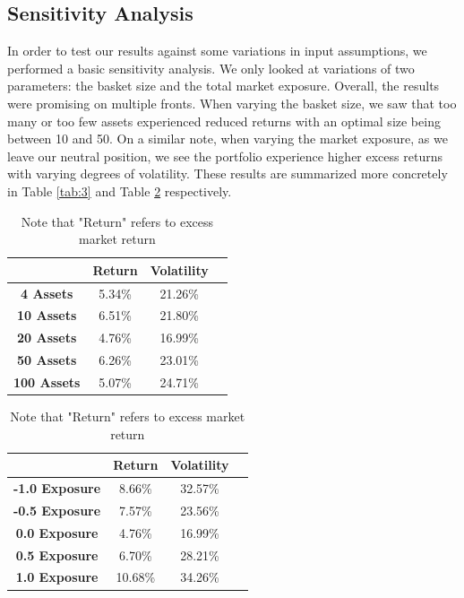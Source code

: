 \documentclass[final]{article}
\begin{document}
\subsection{Sensitivity Analysis}
\hspace{\parindent}In order to test our results against some variations in input assumptions, we performed a basic sensitivity analysis. We only looked at variations of two parameters: the basket size and the total market exposure. Overall, the results were promising on multiple fronts. When varying the basket size, we saw that too many or too few assets experienced reduced returns with an optimal size being between 10 and 50. On a similar note, when varying the market exposure, as we leave our neutral position, we see the portfolio experience higher excess returns with varying degrees of volatility. These results are summarized more concretely in Table \ref{tab:3} and Table \ref{tab:4} respectively.

\begin{table}[ht]
\parbox{0.5\linewidth} {
    \centering
    \begin{tabular}{|c||c|c|c|}
        \hline
         & \textbf{Return} & \textbf{Volatility}\\
         \hline\hline
        \textbf{4 Assets} & 5.34\% & 21.26\% \\
        \hline
        \textbf{10 Assets} & 6.51\% & 21.80\% \\
        \hline
        \textbf{20 Assets} & 4.76\% & 16.99\% \\
        \hline
        \textbf{50 Assets} & 6.26\% & 23.01\% \\
        \hline
        \textbf{100 Assets} & 5.07\% & 24.71\% \\
        \hline
    \end{tabular}
    \caption{Basket size}
    \label{tab:3}
    }
    \hfill
\parbox{0.5\linewidth}{
    \centering
    \begin{tabular}{|c||c|c|c|}
        \hline
         & \textbf{Return} & \textbf{Volatility} \\
         \hline\hline
        \textbf{-1.0 Exposure} & 8.66\% & 32.57\% \\
        \hline
        \textbf{-0.5 Exposure} & 7.57\% & 23.56\% \\
        \hline
        \textbf{0.0 Exposure} & 4.76\% & 16.99\% \\
        \hline
        \textbf{0.5 Exposure} & 6.70\% & 28.21\% \\
        \hline
        \textbf{1.0 Exposure} & 10.68\% & 34.26\% \\
        \hline
    \end{tabular}
    \caption{Market exposure}
    \label{tab:4}
    }
    \caption*{Note that "Return" refers to excess market return}
\end{table}
\end{document}
